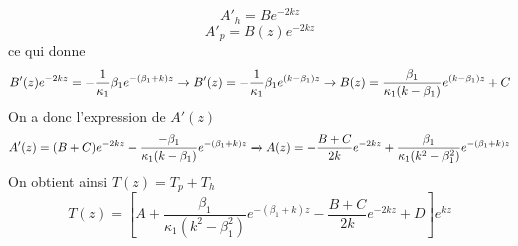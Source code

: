 \documentclass{rapportECC}
\begin{document}
\begin{equation*}
    A'_h = B e^{-2kz}
\end{equation*}
\begin{equation*}
    A'_p = B(z) e^{-2kz}
\end{equation*}
ce qui donne
\begin{equation*}
   B'(z)e^{-2kz} = -\frac{1}{\kappa_1}\beta_1 e^{-(\beta_1+k)z}\\
   \xrightarrow{} B'(z) = -\frac{1}{\kappa_1}\beta_1 e^{(k-\beta_1)z}
   \xrightarrow{} B(z) = \frac{\beta_1}{\kappa_1(k-\beta_1)}e^{(k-\beta_1)z} + C
\end{equation*}
On a donc l'expression de $A'(z)$
\begin{equation*}
   A'(z)=(B+C)e^{-2kz} -\frac{-\beta_1}{\kappa_1(k-\beta_1)} e^{-(\beta_1+k)z}\\
   \xrightarrow{} A(z) = -\frac{B+C}{2k}e^{-2kz}+\frac{\beta_1}{\kappa_1(k^2-\beta_1^2)} e^{-(\beta_1+k)z}
\end{equation*}
On obtient ainsi $T(z) = T_p + T_h$
\begin{equation*}
            T(z) = \left[A+\frac{\beta_1}{\kappa_1(k^2-\beta_1^2)}e^{-(\beta_1+k)z}-\frac{B+C}{2k}e^{-2kz}+D\right]e^{kz} 
\end{equation*}






























\end{document}
